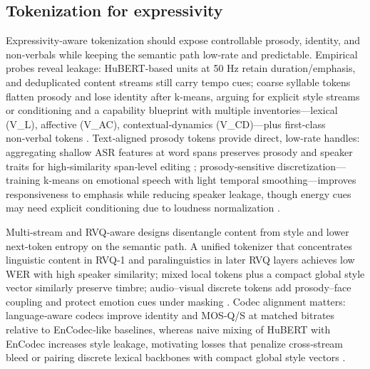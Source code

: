 \documentclass{article}
\begin{document}
\subsection{Tokenization for expressivity} \label{subsec:Tokenization for expressivity}
Expressivity‑aware tokenization should expose controllable prosody, identity, and non‑verbals while keeping the semantic path low‑rate and predictable. Empirical probes reveal leakage: HuBERT‑based units at 50 Hz retain duration/emphasis, and deduplicated content streams still carry tempo cues; coarse syllable tokens flatten prosody and lose identity after k‑means, arguing for explicit style streams or conditioning and a capability blueprint with multiple inventories—lexical (V\_L), affective (V\_{AC}), contextual‑dynamics (V\_{CD})—plus first‑class non‑verbal tokens \cite{peng2024empiricalstudyspeechlanguagemodelsprompt,wang2025bossbeyondsemanticspeech}. Text‑aligned prosody tokens provide direct, low‑rate handles: aggregating shallow ASR features at word spans preserves prosody and speaker traits for high‑similarity span‑level editing \cite{tseng2025tastetextalignedspeechtokenizationembedd}; prosody‑sensitive discretization—training k‑means on emotional speech with light temporal smoothing—improves responsiveness to emphasis while reducing speaker leakage, though energy cues may need explicit conditioning due to loudness normalization \cite{onda2025benchmarkingprosodyencodingdiscretespeec}.

Multi‑stream and RVQ‑aware designs disentangle content from style and lower next‑token entropy on the semantic path. A unified tokenizer that concentrates linguistic content in RVQ‑1 and paralinguistics in later RVQ layers achieves low WER with high speaker similarity; mixed local tokens plus a compact global style vector similarly preserve timbre; audio–visual discrete tokens add prosody–face coupling and protect emotion cues under masking \cite{zhang2024speechtokenizerunifiedspeechtokenizerlar,messica2024nastnoiseawarespeechtokenizationlanguage,sadok2025vectorquantizedmaskedautoencoderaudiovis}. Codec alignment matters: language‑aware codecs improve identity and MOS‑Q/S at matched bitrates relative to EnCodec‑like baselines, whereas naive mixing of HuBERT with EnCodec increases style leakage, motivating losses that penalize cross‑stream bleed or pairing discrete lexical backbones with compact global style vectors \cite{ji2025languagecodecbridgingdiscreterepresentat,peng2024empiricalstudyspeechlanguagemodelsprompt}. 
\end{document}
